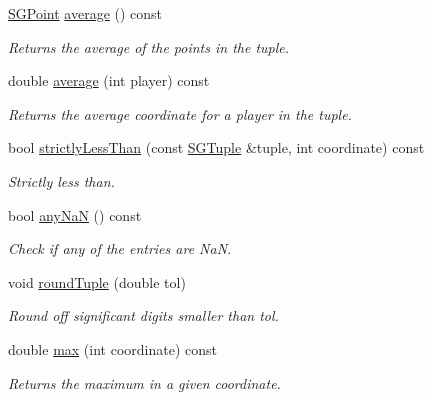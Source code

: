 \begin{DoxyCompactItemize}
\mbox{\label{classSGTuple_a90c1aa7927ebae91fd6f070e942781f1}} 
\hyperlink{classSGPoint}{S\+G\+Point} \hyperlink{classSGTuple_a90c1aa7927ebae91fd6f070e942781f1}{average} () const
\begin{DoxyCompactList}\small\item\em Returns the average of the points in the tuple. \end{DoxyCompactList}\item 
\mbox{\label{classSGTuple_a020eddaa272676d59b678cf49ccbdeb5}} 
double \hyperlink{classSGTuple_a020eddaa272676d59b678cf49ccbdeb5}{average} (int player) const
\begin{DoxyCompactList}\small\item\em Returns the average coordinate for a player in the tuple. \end{DoxyCompactList}\item 
bool \hyperlink{classSGTuple_a4f196f1674d10e9d6cbe3b20c56a2cbd}{strictly\+Less\+Than} (const \hyperlink{classSGTuple}{S\+G\+Tuple} \&tuple, int coordinate) const
\begin{DoxyCompactList}\small\item\em Strictly less than. \end{DoxyCompactList}\item 
\mbox{\label{classSGTuple_aaeba645544ab977deecebed16217a6f0}} 
bool \hyperlink{classSGTuple_aaeba645544ab977deecebed16217a6f0}{any\+NaN} () const
\begin{DoxyCompactList}\small\item\em Check if any of the entries are NaN. \end{DoxyCompactList}\item 
\mbox{\label{classSGTuple_a348c27be7bd4c7fd42341814d30b9d3f}} 
void \hyperlink{classSGTuple_a348c27be7bd4c7fd42341814d30b9d3f}{round\+Tuple} (double tol)
\begin{DoxyCompactList}\small\item\em Round off significant digits smaller than tol. \end{DoxyCompactList}\item 
\mbox{\label{classSGTuple_ad041fb90000ce1031b75d0487a4eff9b}} 
double \hyperlink{classSGTuple_ad041fb90000ce1031b75d0487a4eff9b}{max} (int coordinate) const
\begin{DoxyCompactList}\small\item\em Returns the maximum in a given coordinate. \end{DoxyCompactList}\item 

\end{DoxyCompactItemize}
